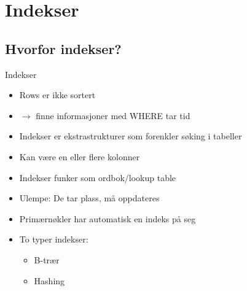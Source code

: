 \section{Indekser}
\subsection*{Hvorfor indekser?}
\begin{frame}{Indekser}
    \begin{itemize}[<+->]
        \item Rows er ikke sortert
        \item $\rightarrow$ finne informasjoner med WHERE tar tid
        \item Indekser er ekstrastrukturer som forenkler søking i tabeller
        \item Kan være en eller flere kolonner 
        \item Indekser funker som ordbok/lookup table
        \item Ulempe: De tar plass, må oppdateres
        \item Primærnøkler har automatisk en indeks på seg
        \item To typer indekser:
            \begin{itemize}
                \item B-trær
                \item Hashing
            \end{itemize}
    \end{itemize}
\end{frame}

